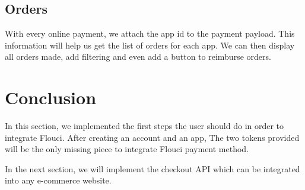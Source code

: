 \begin{spacing}{1.2}
\subsection{Orders}
With every online payment, we attach the app id to the payment payload. This information will help us get the list of orders for each app.
We can then display all orders made, add filtering and even add a button to reimburse orders.

\section*{Conclusion}
In this section, we implemented the first steps the user should do in order to integrate Flouci. After creating an account and an app, The two tokens provided will be the only missing piece to integrate Flouci payment method.

In the next section, we will implement the checkout API which can be integrated into any e-commerce website.
\end{spacing}
